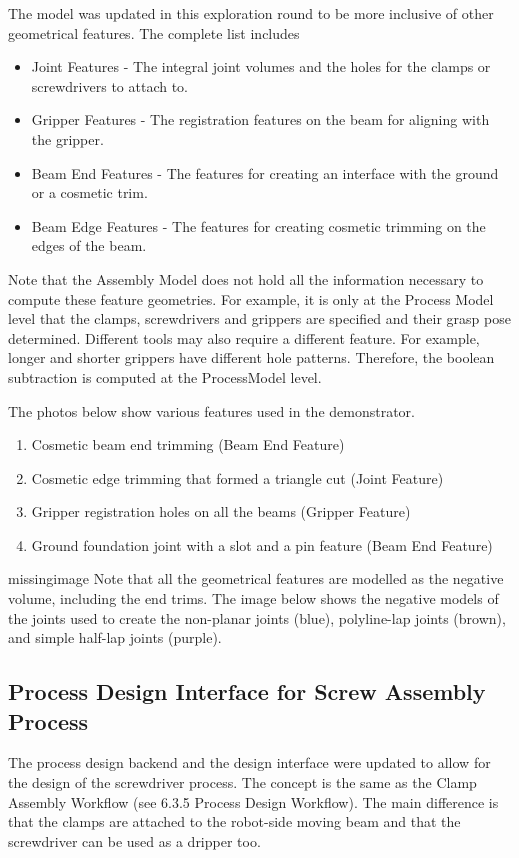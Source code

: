 The model was updated in this exploration round to be more inclusive of other geometrical features. The complete list includes

\begin{itemize}
    \item Joint Features - The integral joint volumes and the holes for the clamps or screwdrivers to attach to.
    \item Gripper Features - The registration features on the beam for aligning with the gripper.
    \item Beam End Features - The features for creating an interface with the ground or a cosmetic trim.
    \item Beam Edge Features - The features for creating cosmetic trimming on the edges of the beam.
\end{itemize}

Note that the Assembly Model does not hold all the information necessary to compute these feature geometries. For example, it is only at the Process Model level that the clamps, screwdrivers and grippers are specified and their grasp pose determined. Different tools may also require a different feature. For example, longer and shorter grippers have different hole patterns. Therefore, the boolean subtraction is computed at the ProcessModel level.

The photos below show various features used in the demonstrator. 
\begin{enumerate}
    \item Cosmetic beam end trimming (Beam End Feature)
    \item Cosmetic edge trimming that formed a triangle cut  (Joint Feature)
    \item Gripper registration holes on all the beams (Gripper Feature)
    \item Ground foundation joint with a slot and a pin feature (Beam End Feature)
\end{enumerate}

missingimage
Note that all the geometrical features are modelled as the negative volume, including the end trims. The image below shows the negative models of the joints used to create the non-planar joints (blue), polyline-lap joints (brown), and simple half-lap joints (purple).

\subsection{Process Design Interface for Screw Assembly Process}
The process design backend and the design interface were updated to allow for the design of the screwdriver process. The concept is the same as the Clamp Assembly Workflow (see 6.3.5 Process Design Workflow). The main difference is that the clamps are attached to the robot-side moving beam and that the screwdriver can be used as a dripper too.

